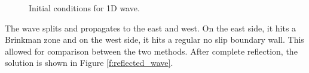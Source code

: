 \begin{center}
 \begin{figure}[h!]
\centering
{}
\caption[Initial conditions for 1D wave ]{Initial conditions for 1D wave.}
\label{f:initial_wave}
\end{figure}
\end{center}

The wave splits and propagates to the east and west.  On the east side, it hits a Brinkman zone and on the west side, it hits a regular no slip boundary wall.  This allowed for comparison between the two methods.  After complete reflection, the solution is shown in Figure \ref{f:reflected_wave}.  

